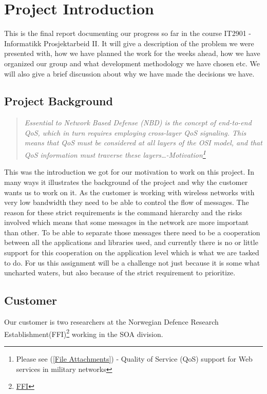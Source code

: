 \section{Project Introduction}\label{Project Introduction}
    This is the final report documenting our progress so far in the course IT2901 - Informatikk Prosjektarbeid II. It will give a description of the problem we were presented with, how we have planned the work for the weeks ahead, how we have organized our group and what development methodology we have chosen etc. We will also give a brief discussion about why we have made the decisions we have.
    
    \subsection{Project Background}\label{Project Background}
    \begin{quotation}
    \em Essential to Network Based Defense (NBD) is the concept of end-to-end QoS, which in turn requires employing cross-layer QoS signaling. This means that QoS must be considered at all layers of the OSI model, and that QoS information must traverse these layers\ldots -Motivation\footnote{Please see (\ref{File Attachments}) - Quality of Service (QoS) support for Web services in military networks}
    \end{quotation}
    This was the introduction we got for our motivation to work on this project. In many ways it illustrates the background of the project and why the customer wants us to work on it. As the customer is working with wireless networks with very low bandwidth they need to be able to control the flow of messages. The reason for these strict requirements is the command hierarchy and the risks involved which means that some messages in the network are more important than other. To be able to separate those messages there need to be a cooperation between all the applications and libraries used, and currently there is no or little support for this cooperation on the application level which is what we are tasked to do. For us this assignment will be a challenge not just because it is some what uncharted waters, but also because of the strict requirement to prioritize.

    \subsection{Customer}\label{Customer}
    Our customer is two researchers at the Norwegian Defence Research Establishment(FFI)\footnote{\href{http://www.ffi.no/no/Sider/default.aspx}{FFI}} working in the SOA division.
    
